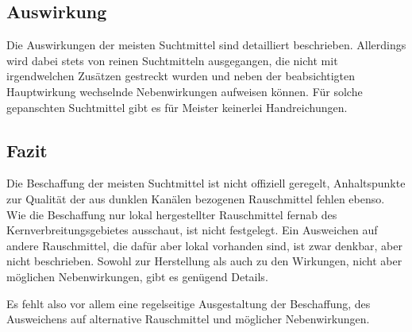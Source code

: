 \subsection{Auswirkung}
Die Auswirkungen der meisten Suchtmittel sind detailliert beschrieben. Allerdings wird dabei stets von reinen Suchtmitteln ausgegangen, die nicht mit irgendwelchen Zusätzen gestreckt wurden und neben der beabsichtigten Hauptwirkung wechselnde Nebenwirkungen aufweisen können. Für solche gepanschten Suchtmittel gibt es für Meister keinerlei Handreichungen.

\subsection{Fazit}
Die Beschaffung der meisten Suchtmittel ist nicht offiziell geregelt, Anhaltspunkte zur Qualität der aus dunklen Kanälen bezogenen Rauschmittel fehlen ebenso. Wie die Beschaffung nur lokal hergestellter Rauschmittel fernab des Kernverbreitungsgebietes ausschaut, ist nicht festgelegt. Ein Ausweichen auf andere Rauschmittel, die dafür aber lokal vorhanden sind, ist zwar denkbar, aber nicht beschrieben. Sowohl zur Herstellung als auch zu den Wirkungen, nicht aber möglichen Nebenwirkungen, gibt es genügend Details.

Es fehlt also vor allem eine regelseitige Ausgestaltung der Beschaffung, des Ausweichens auf alternative Rauschmittel und möglicher Nebenwirkungen.

